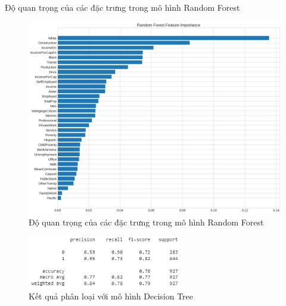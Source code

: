 \documentclass[10pt]{beamer}
\theoremstyle{remark}
\theoremstyle{definition}
\begin{document}
\begin{frame}{Độ quan trọng của các đặc trưng trong mô hình Random Forest}
	\begin{figure}[h!]
        \centering
        \includegraphics[height=0.7\textheight]{figures/Random_Forest_Feature_Importance.png}
        \caption{Độ quan trọng của các đặc trưng trong mô hình Random Forest}
    \end{figure}
\end{frame}

\begin{frame}
	\begin{figure}[h!]
        \centering
        \includegraphics[width=0.6\textwidth]{figures/Decision_Tree_Report.png}
        \caption{Kết quả phân loại với mô hình Decision Tree}
    \end{figure}
\end{frame}
\end{document}
